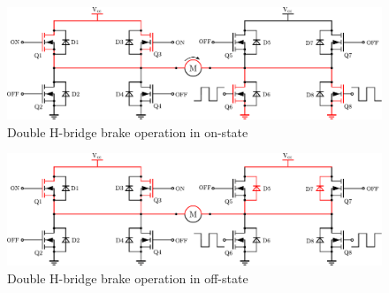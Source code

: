 \begin{figure}[H]
	\centering
	\includegraphics[scale=.6]{figures/DoubleHbridgeBrakeON.pdf}
	\caption{Double H-bridge brake operation in on-state}
	\label{DoubleHbridgeBrakeON}
\end{figure}

\begin{figure}[H]
	\centering
	\includegraphics[scale=.6]{figures/DoubleHbridgeBrakeOFF.pdf}
	\caption{Double H-bridge brake operation in off-state}
	\label{DoubleHbridgeBrakeOFF}
\end{figure}

